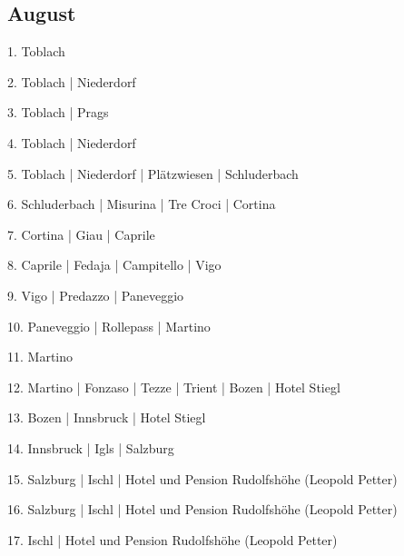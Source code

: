 \documentclass[twoside=false,titlepage=false,open=any, parskip=never, fontsize=10pt, headings=small, chapterprefix=false, appendixprefix=false, DIV=15]{scrbook}
\begin{document}
\begin{multicols}{3}
            \section*{August}
            1. Toblach\par
            2. Toblach | Niederdorf\par
            3. Toblach | Prags\par
            4. Toblach | Niederdorf\par
            5. Toblach | Niederdorf | Plätzwiesen | Schluderbach\par
            6. Schluderbach | Misurina | Tre Croci | Cortina\par
            7. Cortina | Giau | Caprile\par
            8. Caprile | Fedaja | Campitello | Vigo\par
            9. Vigo | Predazzo | Paneveggio\par
            10. Paneveggio | Rollepass | Martino\par
            11. Martino\par
            12. Martino | Fonzaso | Tezze | Trient | Bozen | Hotel Stiegl\par
            13. Bozen | Innsbruck | Hotel Stiegl\par
            14. Innsbruck | Igls | Salzburg\par
            15. Salzburg | Ischl | Hotel und Pension Rudolfshöhe (Leopold Petter)\par
            16. Salzburg | Ischl | Hotel und Pension Rudolfshöhe (Leopold Petter)\par
            17. Ischl | Hotel und Pension Rudolfshöhe (Leopold Petter)\par

\end{multicols}
\end{document}
